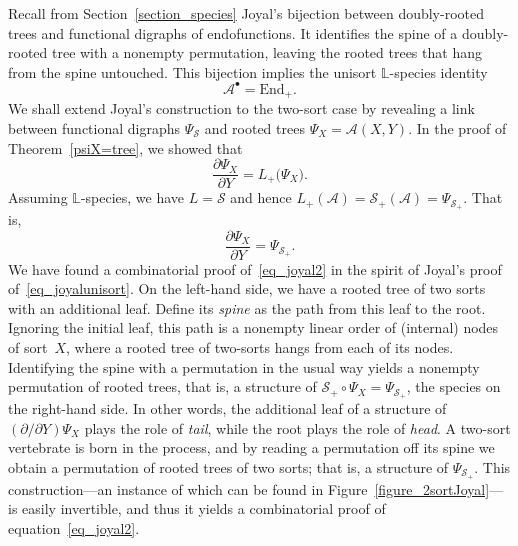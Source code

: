 \documentclass[a4paper,11pt,UKenglish]{article}
\newcommand{\LL}{\mathbb{L}}
\newcommand{\Lin}{L}
\newcommand{\Sym}{\mathcal{S}}
\newcommand{\End}{\mathrm{End}}
\newcommand{\rtree}{\mathcal{A}}
\newcommand{\ddy}[1]{\displaystyle{\frac{\partial{#1}}{\partial Y}}}
\theoremstyle{definition}
\begin{document}
Recall from Section~\ref{section_species} Joyal's
bijection between doubly-rooted trees and functional digraphs of
endofunctions. It identifies the spine of a doubly-rooted tree with
a nonempty permutation, leaving the rooted trees that hang from the
spine untouched. This bijection implies the unisort
$\LL$-species identity
\begin{equation}\label{eq_joyalunisort}
\rtree^{\bullet} = \End_+.
\end{equation}
We shall extend Joyal's construction to the two-sort case by
revealing a link between functional digraphs $\Psi_{\Sym}$
and rooted trees $\Psi_X=\rtree(X,Y)$.
In the proof of Theorem~\ref{psiX=tree}, we showed that
$$
\ddy{\Psi_X} = \Lin_+\bigl(\Psi_X\bigr).
$$
Assuming $\LL$-species, we have $\Lin=\Sym$ and hence
$\Lin_+(\rtree) = \Sym_+(\rtree)=\Psi_{\Sym_+}$. That is,
\begin{equation}\label{eq_joyal2}
\ddy{\Psi_X}=\Psi_{\Sym_+}.
\end{equation}
We have found a combinatorial proof of~\eqref{eq_joyal2}
in the spirit of Joyal's proof of~\eqref{eq_joyalunisort}.
On the left-hand side, we have a rooted tree
of two sorts with an additional leaf. Define its \emph{spine} as the
path from this leaf to the root. Ignoring the initial
leaf, this path is a nonempty linear order of (internal) nodes of
sort~$X$, where a rooted tree of two-sorts hangs from each of its
nodes. Identifying the spine with a permutation in the usual way
yields a nonempty permutation of rooted trees, that is, a structure of
$\Sym_+\circ\Psi_X=\Psi_{\Sym_+}$, the species on the right-hand side.
In other words, the additional leaf of a structure of
$(\partial/\partial Y)\Psi_X$ plays the role of \emph{tail}, while
the root plays the role of \emph{head}.
A two-sort vertebrate is born in the process, and by reading a
permutation off its spine we obtain a permutation of rooted trees of
two sorts; that is, a structure of $\Psi_{\Sym_+}$.
This construction---an instance of which can be
found in Figure~\ref{figure_2sortJoyal}---is easily invertible,
and thus it yields a combinatorial proof of equation~\eqref{eq_joyal2}.
\end{document}
